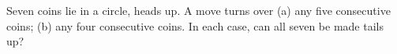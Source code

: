 Seven coins lie in a circle, heads up. A move turns over (a) any five consecutive coins; (b) any four consecutive coins. In each case, can all seven be made tails up?
